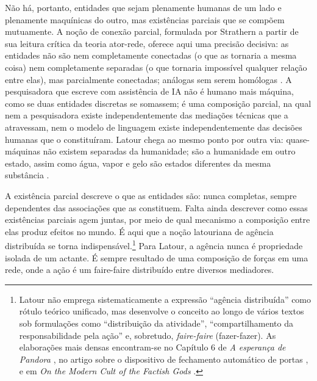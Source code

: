 Não há, portanto, entidades que sejam plenamente humanas de um lado e plenamente maquínicas do outro, mas existências parciais que se compõem mutuamente. A noção de conexão parcial, formulada por Strathern a partir de sua leitura crítica da teoria ator-rede, oferece aqui uma precisão decisiva: as entidades não são nem completamente conectadas (o que as tornaria a mesma coisa) nem completamente separadas (o que tornaria impossível qualquer relação entre elas), mas parcialmente conectadas; análogas sem serem homólogas \parencite{strathern2005partial}. A pesquisadora que escreve com assistência de IA não é humano mais máquina, como se duas entidades discretas se somassem; é uma composição parcial, na qual nem a pesquisadora existe independentemente das mediações técnicas que a atravessam, nem o modelo de linguagem existe independentemente das decisões humanas que o constituíram. Latour chega ao mesmo ponto por outra via: quase-máquinas não existem separadas da humanidade; são a humanidade em outro estado, assim como água, vapor e gelo são estados diferentes da mesma substância \parencite{Latour2008Powers}.

A existência parcial descreve o que as entidades são: nunca completas, sempre dependentes das associações que as constituem. Falta ainda descrever como essas existências parciais agem juntas, por meio de qual mecanismo a composição entre elas produz efeitos no mundo. É aqui que a noção latouriana de agência distribuída se torna indispensável.\footnote{Latour não emprega sistematicamente a expressão ``agência distribuída'' como rótulo teórico unificado, mas desenvolve o conceito ao longo de vários textos sob formulações como ``distribuição da atividade'', ``compartilhamento da responsabilidade pela ação'' e, sobretudo, \textit{faire-faire} (fazer-fazer). As elaborações mais densas encontram-se no Capítulo 6 de \textit{A esperança de Pandora} \parencite{Latour2017Esperanca}, no artigo sobre o dispositivo de fechamento automático de portas \parencite{johnson1988mixing}, e em \textit{On the Modern Cult of the Factish Gods} \parencite{latour2010factish}.} Para Latour, a agência nunca é propriedade isolada de um actante. É sempre resultado de uma composição de forças em uma rede, onde a ação é um faire-faire distribuído entre diversos mediadores.


